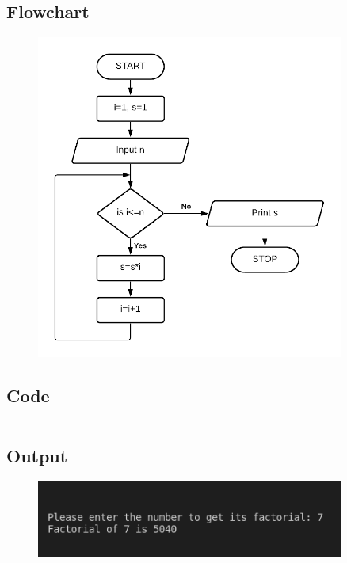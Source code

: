 \documentclass[12pt]{article}
\begin{document}
\subsection{Flowchart}
\begin{figure}[h]
    \centering
    \includegraphics[width=0.9\textwidth]{Flowchart08.png}
\end{figure}
\newpage
\subsection{Code}
\inputminted{c}{q8.c}
\subsection{Output}
\begin{figure}[h]
    \centering
    \includegraphics[width=0.9\textwidth]{8.png}
\end{figure}
\newpage
\section{}
\end{document}

